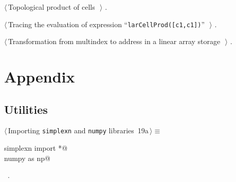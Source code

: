 \documentclass[11pt,oneside]{article}	%
\begin{document}
{\begin{list}{}{\setlength{\itemsep}{-\parsep}\setlength{\itemindent}{-\leftmargin}}
\item $\langle\,$Topological product of cells\nobreak\ {\footnotesize {}}$\,\rangle$ {\footnotesize {\NWtxtRefIn} .}
\item $\langle\,$Tracing the evaluation of expression ``\texttt{larCellProd([c1,c1])}''\nobreak\ {\footnotesize {}}$\,\rangle$ {\footnotesize {\NWtxtNoRef}.}
\item $\langle\,$Transformation from multindex to address in a linear array storage\nobreak\ {\footnotesize {}}$\,\rangle$ {\footnotesize {\NWtxtRefIn} .}
\end{list}}

\appendix
\section{Appendix}
\label{sec:utilities}

\subsection{Utilities}

\begin{flushleft} \small
\begin{minipage}{\linewidth} \label{scrap31}
\protect{}$\langle\,$Importing \texttt{simplexn} and \texttt{numpy} libraries\nobreak\ {\footnotesize 19a}$\,\rangle\equiv$
\vspace{-1ex}
\begin{list}{}{} \item
\mbox{}\verb@from simplexn import *@\\
\mbox{}\verb@import numpy as np@\\
\mbox{}\verb@@{\NWsep}
\end{list}
\vspace{-1ex}
\footnotesize\addtolength{\baselineskip}{-1ex}
\begin{list}{}{\setlength{\itemsep}{-\parsep}\setlength{\itemindent}{-\leftmargin}}
\item \NWtxtMacroRefIn\ .
\end{list}
\end{minipage}\\[4ex]
\end{flushleft}
\end{document}
